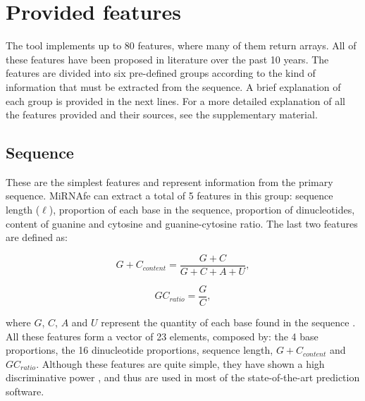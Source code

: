 \documentclass{article}
\begin{document}
\section{Provided features}

The tool implements up to 80 features, where many of them return arrays. All of these features have been proposed in literature over the past 10 years. The 
features are divided into six pre-defined groups according to the kind of information that must be extracted from the sequence. A brief explanation of each 
group is provided in the next lines. For a more detailed explanation of all the features provided and their sources, see the supplementary material.

\subsection{Sequence}
These are the simplest features and represent information from the primary sequence. MiRNAfe can extract a total of 5 features in this group: sequence length 
($\ell$),  proportion of each base in the sequence, proportion of dinucleotides, content of guanine and cytosine and guanine-cytosine ratio. The last two 
features are defined as:

\begin{equation} \label{eq:GCcontent}
 {G+C}_{content} = \frac{G+C}{G+C+A+U},
\end{equation}

\begin{equation} \label{eq:GCratio}
 {GC}_{ratio} = \frac{G}{C},
\end{equation}


\noindent where $G$, $C$, $A$ and $U$ represent the quantity of each base found in the sequence \citep{Hertel06}. All these features form a vector of 23 
elements, composed by: the 4 base proportions, the 16 dinucleotide proportions, sequence length, ${G+C}_{content}$ and ${GC}_{ratio}$. Although these features 
are quite simple, they have shown a high discriminative power \citep{Rukshan09}, and thus are used in most of the state-of-the-art prediction software. 
\end{document}
